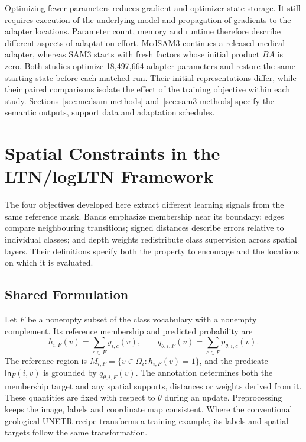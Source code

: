 \documentclass[12pt,a4paper]{article}
\begin{document}
Optimizing fewer parameters reduces gradient and optimizer-state storage.
It still requires execution of the underlying model and propagation of
gradients to the adapter locations. Parameter count, memory and runtime
therefore describe different aspects of adaptation effort. MedSAM3
continues a released medical adapter, whereas SAM3 starts with fresh
factors whose initial product $BA$ is zero. Both studies optimize
18,497,664 adapter parameters and restore the same starting state before
each matched run. Their initial representations differ, while their
paired comparisons isolate the effect of the training objective within
each study. Sections~\ref{sec:medsam-methods} and~\ref{sec:sam3-methods}
specify the semantic outputs, support data and adaptation schedules.

\clearpage
\section{Spatial Constraints in the LTN/logLTN Framework}
\label{sec:spatial-constraints}

The four objectives developed here extract different learning signals from
the same reference mask. Bands emphasize membership near its boundary;
edges compare neighbouring transitions; signed distances describe errors
relative to individual classes; and depth weights redistribute class
supervision across spatial layers. Their definitions specify both
the property to encourage and the locations on which it is evaluated.

\subsection{Shared Formulation}\label{sec:constraint-formulation}

Let $F$ be a nonempty subset of the class vocabulary with a nonempty
complement. Its reference membership and predicted probability are
\begin{equation}
h_{i,F}(v)=\sum_{c\in F}y_{i,c}(v),
\qquad
q_{\theta,i,F}(v)=\sum_{c\in F}p_{\theta,i,c}(v).
\label{eq:constraint-group-membership}
\end{equation}
The reference region is $M_{i,F}=\{v\in\Omega_i:h_{i,F}(v)=1\}$,
and the predicate $\mathsf{In}_F(i,v)$ is grounded by
$q_{\theta,i,F}(v)$. The annotation determines both the membership
target and any spatial supports, distances or weights derived from it.
These quantities are fixed with respect to $\theta$ during an update.
Preprocessing keeps the image, labels and coordinate map consistent.
Where the conventional geological UNETR recipe transforms a training
example, its labels and spatial targets follow the same transformation.
\end{document}
